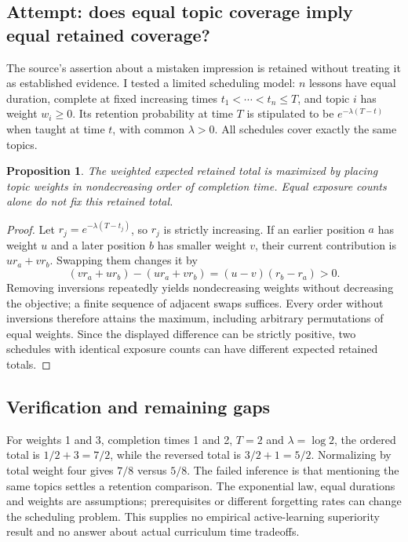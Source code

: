 \documentclass[11pt]{article}
\newtheorem{proposition}{Proposition}
\begin{document}
\subsection{Attempt: does equal topic coverage imply equal retained coverage?}
The source's assertion about a mistaken impression is retained without treating it as established evidence. I tested a limited scheduling model: $n$ lessons have equal duration, complete at fixed increasing times $t_1<\cdots<t_n\le T$, and topic $i$ has weight $w_i\ge0$. Its retention probability at time $T$ is stipulated to be $e^{-\lambda(T-t)}$ when taught at time $t$, with common $\lambda>0$. All schedules cover exactly the same topics.
\begin{proposition}
The weighted expected retained total is maximized by placing topic weights in nondecreasing order of completion time. Equal exposure counts alone do not fix this retained total.
\end{proposition}
\begin{proof}
Let $r_j=e^{-\lambda(T-t_j)}$, so $r_j$ is strictly increasing. If an earlier position $a$ has weight $u$ and a later position $b$ has smaller weight $v$, their current contribution is $ur_a+vr_b$. Swapping them changes it by
\[
(vr_a+ur_b)-(ur_a+vr_b)=(u-v)(r_b-r_a)>0.
\]
Removing inversions repeatedly yields nondecreasing weights without decreasing the objective; a finite sequence of adjacent swaps suffices. Every order without inversions therefore attains the maximum, including arbitrary permutations of equal weights. Since the displayed difference can be strictly positive, two schedules with identical exposure counts can have different expected retained totals.
\end{proof}
\subsection{Verification and remaining gaps}
For weights 1 and 3, completion times 1 and 2, $T=2$ and $\lambda=\log2$, the ordered total is $1/2+3=7/2$, while the reversed total is $3/2+1=5/2$. Normalizing by total weight four gives $7/8$ versus $5/8$. The failed inference is that mentioning the same topics settles a retention comparison. The exponential law, equal durations and weights are assumptions; prerequisites or different forgetting rates can change the scheduling problem. This supplies no empirical active-learning superiority result and no answer about actual curriculum time tradeoffs.
\end{document}
